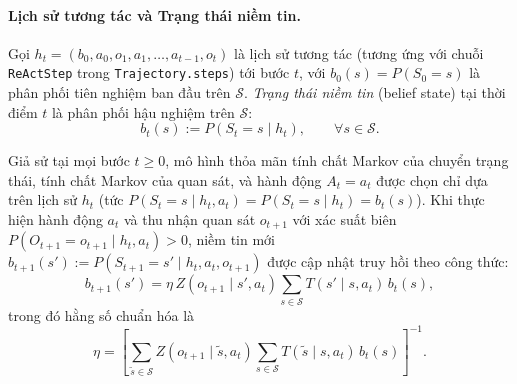 \paragraph{Lịch sử tương tác và Trạng thái niềm tin.}
Gọi $h_t = (b_0, a_0, o_1, a_1, \dots, a_{t-1}, o_t)$ là lịch sử tương tác (tương ứng với chuỗi \texttt{ReActStep} trong \texttt{Trajectory.steps}) tới bước $t$, với $b_0(s) = P(S_0 = s)$ là phân phối tiên nghiệm ban đầu trên $\mathcal{S}$. \emph{Trạng thái niềm tin} (belief state) tại thời điểm $t$ là phân phối hậu nghiệm trên $\mathcal{S}$:
\[
  b_t(s) := P(S_t = s \mid h_t), \qquad \forall s \in \mathcal{S}.
\]

\begin{theorem}
\label{thm:b1-bayes}
Giả sử tại mọi bước $t \ge 0$, mô hình thỏa mãn tính chất Markov của chuyển trạng thái, tính chất Markov của quan sát, và hành động $A_t = a_t$ được chọn chỉ dựa trên lịch sử $h_t$ (tức $P(S_t = s \mid h_t, a_t) = P(S_t = s \mid h_t) = b_t(s)$). Khi thực hiện hành động $a_t$ và thu nhận quan sát $o_{t+1}$ với xác suất biên $P(O_{t+1} = o_{t+1} \mid h_t, a_t) > 0$, niềm tin mới $b_{t+1}(s') := P(S_{t+1} = s' \mid h_t, a_t, o_{t+1})$ được cập nhật truy hồi theo công thức:
\begin{equation}
  b_{t+1}(s') = \eta \, Z(o_{t+1} \mid s', a_t) \sum_{s \in \mathcal{S}} T(s' \mid s, a_t) \, b_t(s),
  \label{eq:b1-belief-update}
\end{equation}
trong đó hằng số chuẩn hóa là
\[
  \eta = \left[\sum_{\tilde{s} \in \mathcal{S}} Z(o_{t+1} \mid \tilde{s}, a_t) \sum_{s \in \mathcal{S}} T(\tilde{s} \mid s, a_t) \, b_t(s)\right]^{-1}.
\]
\end{theorem}

